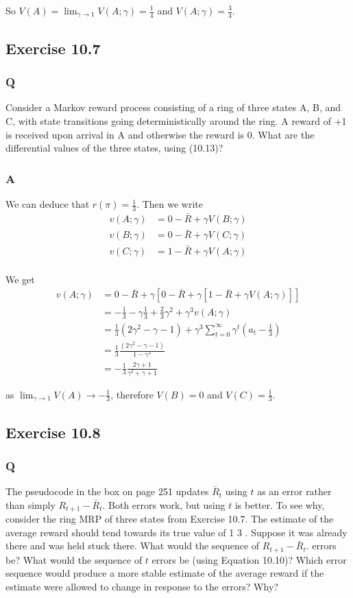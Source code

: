 So $V(A) = \lim_{\gamma \rightarrow 1} V(A; \gamma) = \frac{1}{4}$ and $V(A; \gamma) = \frac{3}{4}$.

\subsection{Exercise 10.7}
\subsubsection{Q}
Consider a Markov reward process consisting of a ring of three states A, B, and C, with state transitions going deterministically around the ring. A reward of +1 is received upon arrival in A and otherwise the reward is 0. What are the differential values of the three states, using (10.13)?
\subsubsection{A}
We can deduce that $r(\pi) = \frac{1}{3}$. Then we write
\begin{align}
v(A; \gamma) &= 0 - \bar{R} + \gamma V(B; \gamma) \\ 
v(B; \gamma) &= 0 - \bar{R} + \gamma V(C; \gamma) \\ 
v(C; \gamma) &= 1 - \bar{R} + \gamma V(A; \gamma) \\ 
\end{align}

We get
\begin{align}
v(A; \gamma) &= 0 - \bar{R} + \gamma\left[0 - \bar{R} + \gamma \left[1 - \bar{R} + \gamma V(A; \gamma)\right]\right] \\ 
&=  -\frac{1}{3} - \gamma \frac{1}{3} + \frac{2}{3}\gamma^2 + \gamma^3 v(A; \gamma) \\
&= \frac{1}{3}(2\gamma^2 - \gamma - 1) + \gamma^3 \sum_{t=0}^{\infty} \gamma^t(a_t - \frac{1}{3}) \\
&= \frac{1}{3} \frac{(2\gamma^2 - \gamma - 1)}{1 - \gamma^3} \\
&= - \frac{1}{3} \frac{2\gamma + 1}{\gamma^2 + \gamma + 1}
\end{align}

as $\lim_{\gamma \rightarrow 1} V(A) \rightarrow - \frac{1}{3}$, therefore $V(B) = 0$ and $V(C) = \frac{1}{3}$.

\subsection{Exercise 10.8}
\subsubsection{Q}
The pseudocode in the box on page 251 updates $\bar{R}_t$ using $t$ as an error rather than simply $R_{t+1} - \bar{R}_t$. Both errors work, but using $t$ is better. To see why, consider the ring MRP of three states from Exercise 10.7. The estimate of the average reward should tend towards its true value of 1 3 . Suppose it was already there and was held stuck there. What would the sequence of $R_{t+1} - \bar{R}_t$. errors be? What would the sequence of $t$ errors be (using Equation 10.10)? Which error sequence would produce a more stable estimate of the average reward if the estimate were allowed to change in response to the errors? Why?

